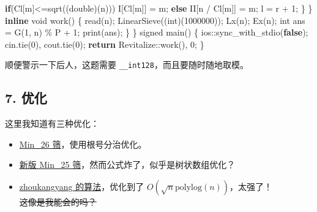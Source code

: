 \documentclass[
]{article}
\newenvironment{Shaded}{}{}
\newcommand{\ControlFlowTok}[1]{\textcolor[rgb]{0.00,0.44,0.13}{\textbf{#1}}}
\newcommand{\DataTypeTok}[1]{\textcolor[rgb]{0.56,0.13,0.00}{#1}}
\newcommand{\DecValTok}[1]{\textcolor[rgb]{0.25,0.63,0.44}{#1}}
\newcommand{\KeywordTok}[1]{\textcolor[rgb]{0.00,0.44,0.13}{\textbf{#1}}}
\newcommand{\NormalTok}[1]{#1}
\newcommand{\OperatorTok}[1]{\textcolor[rgb]{0.40,0.40,0.40}{#1}}
\begin{document}
\begin{Shaded}
\begin{Highlighting}[]
            \ControlFlowTok{if}\OperatorTok{(}\NormalTok{Cl}\OperatorTok{[}\NormalTok{m}\OperatorTok{]\textless{}=}\NormalTok{sqrt}\OperatorTok{((}\DataTypeTok{double}\OperatorTok{)(}\NormalTok{n}\OperatorTok{)))}
\NormalTok{                I}\OperatorTok{[}\NormalTok{Cl}\OperatorTok{[}\NormalTok{m}\OperatorTok{]]} \OperatorTok{=}\NormalTok{ m}\OperatorTok{;}
            \ControlFlowTok{else}
\NormalTok{                II}\OperatorTok{[}\NormalTok{n }\OperatorTok{/}\NormalTok{ Cl}\OperatorTok{[}\NormalTok{m}\OperatorTok{]]} \OperatorTok{=}\NormalTok{ m}\OperatorTok{;}
\NormalTok{            l }\OperatorTok{=}\NormalTok{ r }\OperatorTok{+} \DecValTok{1}\OperatorTok{;}
        \OperatorTok{\}}
    \OperatorTok{\}}
    \KeywordTok{inline} \DataTypeTok{void}\NormalTok{ work}\OperatorTok{()}
    \OperatorTok{\{}
\NormalTok{        read}\OperatorTok{(}\NormalTok{n}\OperatorTok{);}
\NormalTok{        LinearSieve}\OperatorTok{((}\DataTypeTok{int}\OperatorTok{)(}\DecValTok{1000000}\OperatorTok{));}
\NormalTok{        Lx}\OperatorTok{(}\NormalTok{n}\OperatorTok{);}
\NormalTok{        Ex}\OperatorTok{(}\NormalTok{n}\OperatorTok{);}
        \DataTypeTok{int}\NormalTok{ ans }\OperatorTok{=}\NormalTok{ G}\OperatorTok{(}\DecValTok{1}\OperatorTok{,}\NormalTok{ n}\OperatorTok{)} \OperatorTok{\%}\NormalTok{ P }\OperatorTok{+} \DecValTok{1}\OperatorTok{;}
\NormalTok{        print}\OperatorTok{(}\NormalTok{ans}\OperatorTok{);}
    \OperatorTok{\}}
\OperatorTok{\}}
\DataTypeTok{signed}\NormalTok{ main}\OperatorTok{()}
\OperatorTok{\{}
\NormalTok{    ios}\OperatorTok{::}\NormalTok{sync\_with\_stdio}\OperatorTok{(}\KeywordTok{false}\OperatorTok{);}
\NormalTok{    cin}\OperatorTok{.}\NormalTok{tie}\OperatorTok{(}\DecValTok{0}\OperatorTok{),}\NormalTok{ cout}\OperatorTok{.}\NormalTok{tie}\OperatorTok{(}\DecValTok{0}\OperatorTok{);}
    \ControlFlowTok{return}\NormalTok{ Revitalize}\OperatorTok{::}\NormalTok{work}\OperatorTok{(),} \DecValTok{0}\OperatorTok{;}
\OperatorTok{\}}
\end{Highlighting}
\end{Shaded}

顺便警示一下后人，这题需要 \texttt{\_\_int128}，而且要随时随地取模。

\subsection{7. 优化}\label{7-ux4f18ux5316}

这里我知道有三种优化：

\begin{itemize}
\item
  \href{https://www.luogu.com.cn/article/gw5rqtsc}{Min\_26
  筛}，使用根号分治优化。
\item
  \href{https://zhidao.baidu.com/question/692919259662897292.html}{新版
  Min\_25 筛}，然而公式炸了，似乎是树状数组优化？
\item
  \href{https://www.cnblogs.com/zkyJuruo/p/17544928.html}{zhoukangyang
  的算法}，优化到了 \(O(\sqrt{n}\mathrm{polylog}(n))\)，太强了！\\
  \st{这像是我能会的吗？}
\end{itemize}
\end{document}
